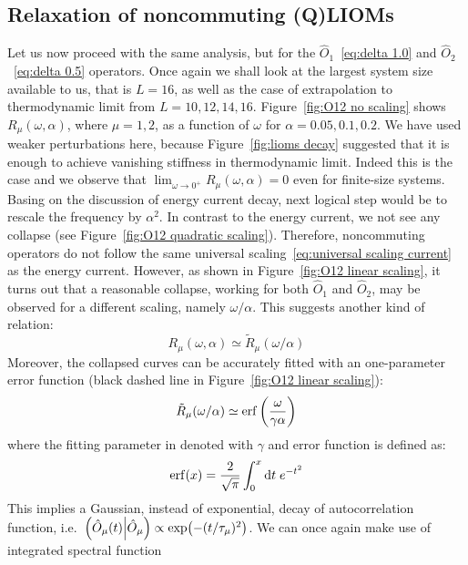 \subsection{Relaxation of noncommuting (Q)LIOMs}
Let us now proceed with the same analysis, but for the \(\hat{O}_1\)~\eqref{eq:delta 1.0} 
and \(\hat{O}_2\)~\eqref{eq:delta 0.5} operators. Once again we shall look at the largest
system size available to us, that is \(L = 16\), as well as the case of extrapolation
to thermodynamic limit from \(L = 10,12,14,16\). Figure~\ref{fig:O12 no scaling} shows
\(R_{\mu}(\omega,\alpha)\), where \(\mu=1,2\), as a function of \(\omega\) for \(\alpha = 0.05,0.1,0.2\).
We have used weaker perturbations here, because Figure~\ref{fig:lioms decay} suggested that
it is enough to achieve vanishing stiffness in thermodynamic limit. Indeed this is the case
and we observe that \(\lim_{{\omega\to 0^{+}}} R_{\mu}(\omega,\alpha) = 0\) even for finite-size systems.
Basing on the discussion of energy current decay, next logical step would be to rescale the
frequency by \(\alpha^2\). In contrast to the energy current, we not see any collapse (see Figure~\ref{fig:O12 quadratic scaling}).
Therefore, noncommuting operators do not follow the same universal scaling~\eqref{eq:universal scaling current}
as the energy current. However, as shown in Figure~\ref{fig:O12 linear scaling},
it turns out that a reasonable collapse, working for both \(\hat{O}_1\) and \(\hat{O}_2\),
may be observed for a different scaling, namely \(\omega/\alpha\). This suggests another kind
of relation:
\begin{equation}
  R_{\mu}(\omega,\alpha) \simeq \tilde{R}_{\mu}(\omega/\alpha)
\end{equation}
Moreover, the collapsed curves can be accurately fitted with an one-parameter error function
 (black dashed line in Figure~\ref{fig:O12 linear scaling}):
\begin{equation}
  \tilde{R}_{\mu}(\omega/\alpha) \simeq \erf\left(\frac{\omega}{\gamma \alpha}\right)
  \label{eq:erf fit}
\end{equation}
where the fitting parameter in denoted with \(\gamma\) and error function is defined as:
\begin{equation}
\erf(x) = \frac{2}{\sqrt{\pi}} \int_{0}^{x} \mathrm{d}t\; e^{-t^2}  
\end{equation}
This implies a Gaussian, instead of
exponential, decay of autocorrelation function, i.e.\ \(\left(\hat{O}_{\mu}(t) \middle| \hat{O}_{\mu}\right)
\propto \exp(-(t/\tau_{\mu})^2)\). We can once again make use of integrated spectral function
